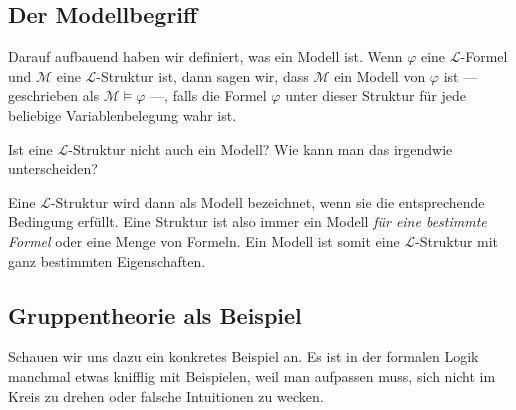 \subsection{Der Modellbegriff}
\begin{spoken-clean}[00:09:40 - 00:10:38]
Darauf aufbauend haben wir definiert, was ein Modell ist. Wenn $\varphi$ eine $\mathcal{L}$-Formel und $\mathcal{M}$ eine $\mathcal{L}$-Struktur ist, dann sagen wir, dass $\mathcal{M}$ ein Modell von $\varphi$ ist --- geschrieben als $\mathcal{M} \models \varphi$ ---, falls die Formel $\varphi$ unter dieser Struktur für jede beliebige Variablenbelegung wahr ist.
\end{spoken-clean}

\begin{math-stroke}
\end{math-stroke}

\begin{student-interaction}
Ist eine $\mathcal{L}$-Struktur nicht auch ein Modell? Wie kann man das irgendwie unterscheiden?
\end{student-interaction}

\begin{spoken-clean}[continued]
Eine $\mathcal{L}$-Struktur wird dann als Modell bezeichnet, wenn sie die entsprechende Bedingung erfüllt. Eine Struktur ist also immer ein Modell \emph{für eine bestimmte Formel} oder eine Menge von Formeln. Ein Modell ist somit eine $\mathcal{L}$-Struktur mit ganz bestimmten Eigenschaften.
\end{spoken-clean}

\begin{ai-global-state-checkpoint-invisible-content}
\end{ai-global-state-checkpoint-invisible-content}

\subsection{Gruppentheorie als Beispiel}
\begin{spoken-clean}[00:11:55 - 00:12:15]
Schauen wir uns dazu ein konkretes Beispiel an. Es ist in der formalen Logik manchmal etwas knifflig mit Beispielen, weil man aufpassen muss, sich nicht im Kreis zu drehen oder falsche Intuitionen zu wecken.
\end{spoken-clean}

